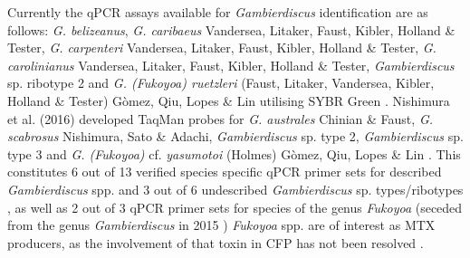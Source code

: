 \documentclass[12pt]{article}
\begin{document}
Currently the qPCR assays available for \emph{Gambierdiscus} identification are as follows: \emph{G. belizeanus}, \emph{G. caribaeus} Vandersea, Litaker, Faust, Kibler, Holland \& Tester, \emph{G. carpenteri} Vandersea, Litaker, Faust, Kibler, Holland \& Tester, \emph{G. carolinianus} Vandersea, Litaker, Faust, Kibler, Holland \& Tester, \emph{Gambierdiscus} sp. ribotype 2 and \emph{G. (Fukoyoa) ruetzleri} (Faust, Litaker, Vandersea, Kibler, Holland \& Tester) G\`omez, Qiu, Lopes \& Lin utilising SYBR Green \citep{vandersea2012development}. Nishimura et al. (2016) developed TaqMan probes for \emph{G. australes} Chinian \& Faust, \emph{G. scabrosus} Nishimura, Sato \& Adachi, \emph{Gambierdiscus} sp. type 2, \emph{Gambierdiscus} sp. type 3 and \emph{G. (Fukoyoa)} cf. \emph{yasumotoi} (Holmes) G\`omez, Qiu, Lopes \& Lin \citep{nishimura2016quantitative}. This constitutes 6 out of 13 verified species specific qPCR primer sets for described \emph{Gambierdiscus} spp. and 3 out of 6 undescribed \emph{Gambierdiscus} sp. types/ribotypes , as well as 2 out of 3 qPCR primer sets for species of the genus \emph{Fukoyoa} (seceded from the genus \emph{Gambierdiscus} in 2015 \citep{gomez2015fukuyoa}) \textit{Fukoyoa} spp. are of interest as MTX producers, as the involvement of that toxin in CFP has not been resolved \citep{kohli2014feeding}. \\
\end{document}
